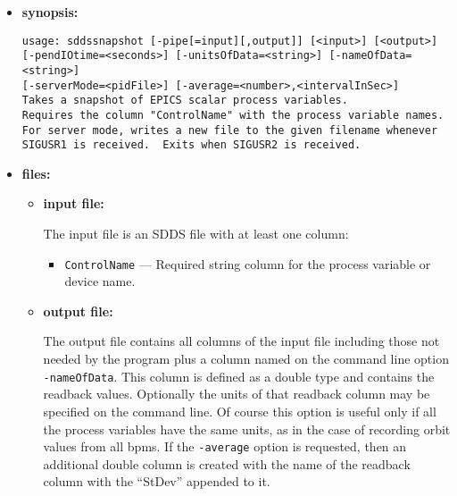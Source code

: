 \begin{itemize}
\item {\bf synopsis:} 
%
%
\begin{verbatim}
usage: sddssnapshot [-pipe[=input][,output]] [<input>] [<output>]
[-pendIOtime=<seconds>] [-unitsOfData=<string>] [-nameOfData=<string>]
[-serverMode=<pidFile>] [-average=<number>,<intervalInSec>]
Takes a snapshot of EPICS scalar process variables.
Requires the column "ControlName" with the process variable names.
For server mode, writes a new file to the given filename whenever
SIGUSR1 is received.  Exits when SIGUSR2 is received.
\end{verbatim}
\item {\bf files:}
\begin{itemize}
\item {\bf input file:}\par
The input file is an SDDS file with at least one column:
\begin{itemize}
        \item {\tt ControlName} --- Required string column for the process variable or device name.
\end{itemize}

\item {\bf output file:}\par
The output file contains all columns of the input file including those
not needed by the program plus a column named on the command line option {\tt -nameOfData}.
This column is defined as a double type and contains the readback values. 
Optionally the units of that readback column may be specified on the command line.
Of course this option is useful only if all the process variables have the same units, as in
the case of recording orbit values from all bpms.
If the {\tt -average} option is requested, then an additional double column is created with the name
of the readback column with the ``StDev'' appended to it.


\end{itemize}
\end{itemize}
